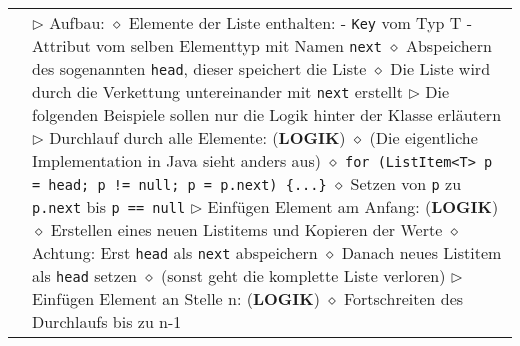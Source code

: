 \begin{longtable}{ | p{} p{} | }
	\makecell[l]{\texttt{LinkedList}} & \makecell[l]{
	$\triangleright$ Aufbau: \\
	\hspace{0.4cm} $\diamond$ Elemente der Liste enthalten: \\
	\hspace{0.6cm} - \texttt{Key} vom Typ T \\
	\hspace{0.6cm} - Attribut vom selben Elementtyp mit Namen \texttt{next} \\
	\hspace{0.4cm} $\diamond$ Abspeichern des sogenannten \texttt{head}, dieser speichert die Liste \\
	\hspace{0.4cm} $\diamond$ Die Liste wird durch die Verkettung untereinander mit \texttt{next} erstellt \\
	$\triangleright$ Die folgenden Beispiele sollen nur die Logik hinter der Klasse erläutern \\
	$\triangleright$ Durchlauf durch alle Elemente: (\textbf{LOGIK})\\
	\hspace{0.4cm} $\diamond$ (Die eigentliche Implementation in Java sieht anders aus) \\
	\hspace{0.4cm} $\diamond$ \texttt{for (ListItem<T> p = head; p != null; p = p.next) \{...\}} \\
	\hspace{0.4cm} $\diamond$ Setzen von \texttt{p} zu \texttt{p.next} bis \texttt{p == null} \\
	$\triangleright$ Einfügen Element am Anfang: (\textbf{LOGIK}) \\
	\hspace{0.4cm} $\diamond$ Erstellen eines neuen Listitems und Kopieren der Werte \\
	\hspace{0.4cm} $\diamond$ Achtung: Erst \texttt{head} als \texttt{next} abspeichern \\
	\hspace{0.4cm} $\diamond$ Danach neues Listitem als \texttt{head} setzen \\
	\hspace{0.4cm} $\diamond$ (sonst geht die komplette Liste verloren) \\
	$\triangleright$ Einfügen Element an Stelle n: (\textbf{LOGIK}) \\
	\hspace{0.4cm} $\diamond$ Fortschreiten des Durchlaufs bis zu n-1 \\
}
\end{longtable}
